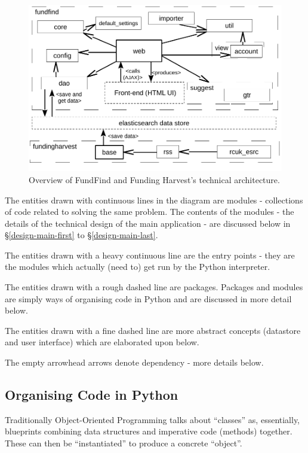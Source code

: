 \begin{figure}[H]
\centering
\includegraphics[width=1.00\textwidth,]{Chapter3/overview_design.pdf}
\caption{Overview of FundFind and Funding Harvest's technical architecture.}
\label{fig:arch}
\end{figure}

The entities drawn with continuous lines in the diagram are modules - collections of code related to solving the same problem. The contents of the modules - the details of the technical design of the main application - are discussed below in \S\ref{design-main-first} to \S\ref{design-main-last}.

The entities drawn with a heavy continuous line are the entry points - they are the modules which actually (need to) get run by the Python interpreter.

The entities drawn with a rough dashed line are packages. Packages and modules are simply ways of organising code in Python and are discussed in more detail below.

The entities drawn with a fine dashed line are more abstract concepts (datastore and user interface) which are elaborated upon below.

The empty arrowhead arrows denote dependency - more details below.

\subsection{Organising Code in Python}
\label{organising-code-python}
Traditionally Object-Oriented Programming talks about ``classes'' as, essentially, blueprints combining data structures and imperative code (methods) together. These can then be ``instantiated'' to produce a concrete ``object''.

